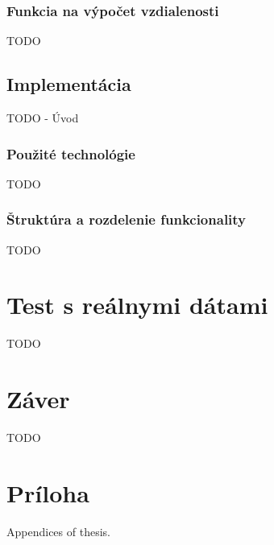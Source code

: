 \documentclass[
  printed, %
  table,   %
  lof,     %
  lot,     %
]{fithesis3}
\begin{document}
\subsection{Funkcia na výpočet vzdialenosti}
TODO

\section{Implementácia}
TODO - Úvod

\subsection{Použité technológie}
TODO

\subsection{Štruktúra a rozdelenie funkcionality}
TODO

\chapter{Test s reálnymi dátami}
\label{ch:data}
TODO

\chapter{Záver}
TODO

\makeatletter\thesis@blocks@clear\makeatother
{} %
\printindex

\appendix %
\chapter{Príloha}
Appendices of thesis.
\end{document}
